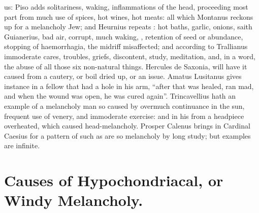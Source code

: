 us: Piso adds solitariness, waking, inflammations of the head, proceeding most
part from much use of spices, hot wines, hot meats: all
which Montanus reckons up  for a melancholy
Jew; and Heurnius repeats : hot baths,
garlic, onions, saith Guianerius, bad air, corrupt, much
waking, \etc{}, retention of seed or abundance, stopping
of haemorrhagia, the midriff misaffected; and according to Trallianus
 immoderate cares, troubles, griefs,
discontent, study, meditation, and, in a word, the abuse of all those six
non-natural things. Hercules de Saxonia,  will have it caused from a cautery, or boil dried up,
or an issue. Amatus Lusitanus  gives
instance in a fellow that had a hole in his arm, \enquote{after
that was healed, ran mad, and when the wound was open, he was cured again}.
Trincavellius  hath an example of a
melancholy man so caused by overmuch continuance in the sun, frequent use of
venery, and immoderate exercise: and in his  from a headpiece overheated, which caused
head-melancholy. Prosper Calenus brings in Cardinal Caesius for a pattern of
such as are so melancholy by long study; but examples are infinite.

\section{Causes of Hypochondriacal, or Windy Melancholy.}

